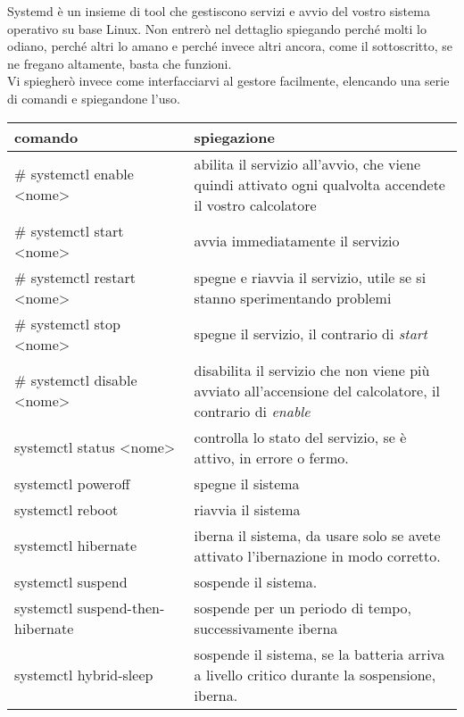 \documentclass[twoside,italian]{book}
\begin{document}
			Systemd è un insieme di tool che gestiscono servizi e avvio del vostro sistema operativo su base Linux. Non entrerò nel dettaglio spiegando perché molti lo odiano, perché altri lo amano e perché invece altri ancora, come il sottoscritto, se ne fregano altamente, basta che funzioni.\\
			
			Vi spiegherò invece come interfacciarvi al gestore facilmente, elencando una serie di comandi e spiegandone l'uso.
			
			\begin{flushleft}
				\begin{tabu}{|>{\color{white} }m{0.4\linewidth}|>{}m{0.6\linewidth}}
					\hline
					\textbf{comando} & \textbf{spiegazione} \\
					\hline \hline
					\# systemctl enable <nome> & abilita il servizio all'avvio, che viene quindi attivato ogni qualvolta accendete il vostro calcolatore \\ 
					\hline
					\# systemctl start <nome> & avvia immediatamente il servizio \\
					\hline
					\# systemctl restart <nome> & spegne e riavvia il servizio, utile se si stanno sperimentando problemi \\
					\hline
					\# systemctl stop <nome> & spegne il servizio, il contrario di \textit{start} \\ 
					\hline
					\# systemctl disable <nome> & disabilita il servizio che non viene più avviato all'accensione del calcolatore, il contrario di \textit{enable} \\ 
					\hline
					systemctl status <nome> & controlla lo stato del servizio, se è attivo, in errore o fermo. \\
					\hline
					systemctl poweroff & spegne il sistema \\
					\hline
					systemctl reboot & riavvia il sistema \\
					\hline
					systemctl hibernate & iberna il sistema, da usare solo se avete attivato l'ibernazione in modo corretto.\\
					\hline 
					systemctl suspend & sospende il sistema.\\
					\hline
					systemctl suspend-then-hibernate & sospende per un periodo di tempo, successivamente iberna \\ 
					\hline
					systemctl hybrid-sleep & sospende il sistema, se la batteria arriva a livello critico durante la sospensione, iberna. \\
					\hline
					
					
					
				\end{tabu}
			\end{flushleft}
		
\end{document}
